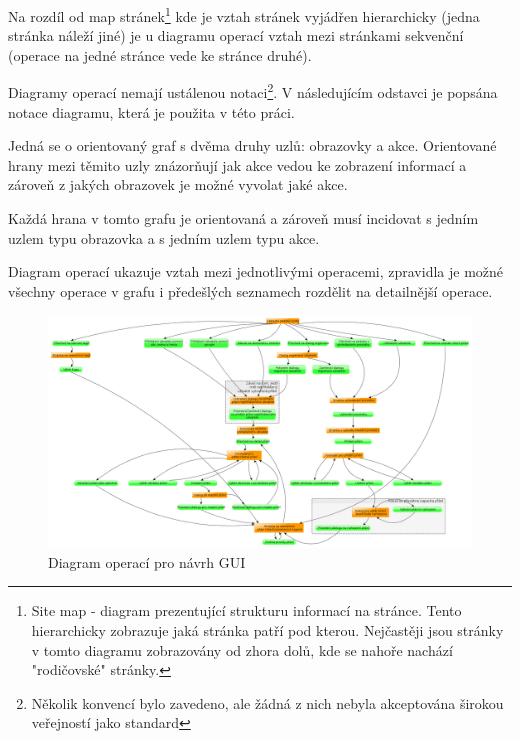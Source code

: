 Na rozdíl od map stránek\footnote{Site map - diagram prezentující strukturu informací na stránce. Tento hierarchicky zobrazuje jaká stránka patří pod kterou. Nejčastěji jsou stránky v tomto diagramu zobrazovány od zhora dolů, kde se nahoře nachází "rodičovské" stránky\cite{brown2007communicating}.} kde je vztah stránek vyjádřen hierarchicky (jedna stránka náleží jiné) je u diagramu operací vztah mezi stránkami sekvenční (operace na jedné stránce vede ke stránce druhé)\cite{brown2007communicating}.

Diagramy operací nemají ustálenou notaci\footnote{Několik konvencí bylo zavedeno, ale žádná z nich nebyla akceptována širokou veřejností jako standard\cite{brown2007communicating}}. V následujícím odstavci je popsána notace diagramu, která je použita v této práci.  

Jedná se o orientovaný graf s dvěma druhy uzlů: obrazovky a akce. Orientované hrany mezi těmito uzly znázorňují jak akce vedou ke zobrazení informací a zároveň z jakých obrazovek je možné vyvolat jaké akce.

Každá hrana v tomto grafu je orientovaná a zároveň musí incidovat s jedním uzlem typu obrazovka a s jedním uzlem typu akce.

Diagram operací ukazuje vztah mezi jednotlivými operacemi, zpravidla je možné všechny operace v grafu i předešlých seznamech rozdělit na detailnější operace.

\begin{figure}[htb]
\begin{center}
\includegraphics[width=150mm]{./pictures/taskGraph.png}
\caption{Diagram operací pro návrh GUI}
\label{fig:taskGraph}
\end{center}
\end{figure}

